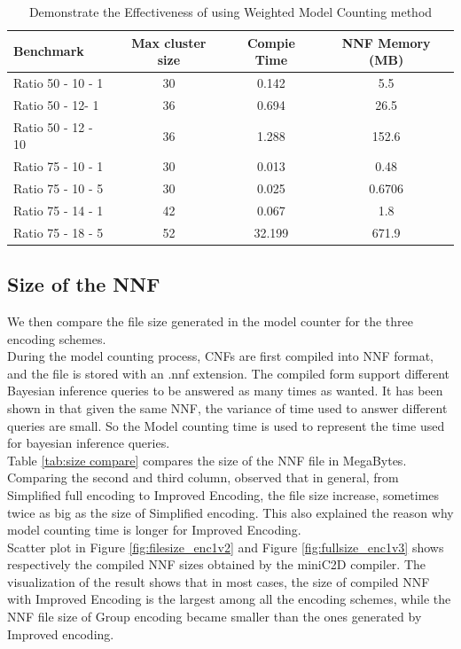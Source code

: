 \begin{table}[]
    \centering
    \begin{tabular}{l|c c c}
	\hline
   Benchmark					&	Max cluster size	&	Compie Time	&	NNF Memory (MB)	\\
   \hline
   \hline
    Ratio 50	-	10	-	1	&	30	&	0.142	&	5.5	\\
    Ratio 50	-	12-	1	&	36	&	0.694	&	26.5	\\
    Ratio 50	-	12	-	10	&	36	&	1.288	&	152.6	\\
    Ratio 75	-	10	-	1	&	30	&	0.013	&	0.48	\\
    Ratio 75	-	10	-	5	&	30	&	0.025	&	0.6706	\\
    Ratio 75	-	14	-	1	&	42	&	0.067	&	1.8	\\
    Ratio 75	-	18	-	5	&	52	&	32.199	&	671.9	\\
        \hline
    \end{tabular}
    \caption{Demonstrate the Effectiveness of using Weighted Model Counting method}
    \label{tab:treesize}
\end{table}

\subsection{Size of the NNF}
We then compare the file size generated in the model counter for the three encoding schemes. \\

\noindent During the model counting process, CNFs are first compiled into NNF format, and the file is stored with an .nnf extension. The compiled form support different Bayesian inference queries to be answered as many times as wanted. It has been shown in \cite{2008-literature-review} that given the same NNF, the variance of time used to answer different queries are small. So the Model counting time is used to represent the time used for bayesian inference queries.\\

\noindent Table \ref{tab:size compare} compares the size of the NNF file in MegaBytes. Comparing the second and third column, observed that in general, from Simplified full encoding to Improved Encoding, the file size increase, sometimes twice as big as the size of Simplified encoding.
This also explained the reason why model counting time is longer for Improved Encoding.\\

\noindent Scatter plot in Figure \ref{fig:filesize_enc1v2} and Figure  \ref{fig:fullsize_enc1v3} shows respectively the compiled NNF sizes obtained by the miniC2D compiler. The visualization of the result shows that in most cases, the size of compiled NNF with Improved Encoding is the largest among all the encoding schemes, while the NNF file size of Group encoding became smaller than the ones generated by Improved encoding.

